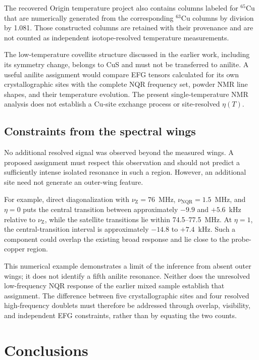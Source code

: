 \documentclass[10pt,a4paper,twocolumn]{article}
\newcommand{\nqr}{\mathrm{NQR}}
\newcommand{\nuz}{\nu_{\mathrm Z}}
\begin{document}
The recovered Origin temperature project also contains columns labeled for $^{65}$Cu that are numerically generated from the corresponding $^{63}$Cu columns by division by 1.081. Those constructed columns are retained with their provenance and are not counted as independent isotope-resolved temperature measurements.

The low-temperature covellite structure discussed in the earlier work, including its symmetry change, belongs to CuS and must not be transferred to anilite. A useful anilite assignment would compare EFG tensors calculated for its own crystallographic sites with the complete NQR frequency set, powder NMR line shapes, and their temperature evolution. The present single-temperature NMR analysis does not establish a Cu-site exchange process or site-resolved $\eta(T)$.

\subsection{Constraints from the spectral wings}

No additional resolved signal was observed beyond the measured wings. A proposed assignment must respect this observation and should not predict a sufficiently intense isolated resonance in such a region. However, an additional site need not generate an outer-wing feature.

For example, direct diagonalization with $\nuz=76$~MHz, $\nu_{\nqr}=1.5$~MHz, and $\eta=0$ puts the central transition between approximately $-9.9$ and $+5.6$~kHz relative to $\nuz$, while the satellite transitions lie within 74.5--77.5~MHz. At $\eta=1$, the central-transition interval is approximately $-14.8$ to $+7.4$~kHz. Such a component could overlap the existing broad response and lie close to the probe-copper region.

This numerical example demonstrates a limit of the inference from absent outer wings; it does not identify a fifth anilite resonance. Neither does the unresolved low-frequency NQR response of the earlier mixed sample establish that assignment. The difference between five crystallographic sites and four resolved high-frequency doublets must therefore be addressed through overlap, visibility, and independent EFG constraints, rather than by equating the two counts.

\section{Conclusions}
\end{document}
